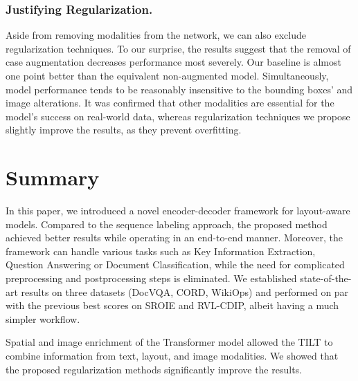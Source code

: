 \documentclass[runningheads]{llncs}
\begin{document}
\subsubsection{Justifying Regularization.} Aside from removing modalities from the network, we can also exclude regularization techniques.
To our surprise, the results suggest that the removal of case augmentation decreases performance most severely. Our baseline is almost one point better than the equivalent non-augmented model.
Simultaneously, model performance tends to be reasonably insensitive to the bounding boxes' and image alterations.
It was confirmed that other modalities are essential for the model's success on real-world data, whereas regularization techniques we propose slightly improve the results, as they prevent overfitting.













\section{Summary}
In this paper, we introduced a novel encoder-decoder framework for layout-aware models. Compared to the sequence labeling approach, the proposed method achieved better results while operating in an end-to-end manner. Moreover, the framework can handle various tasks such as Key Information Extraction, Question Answering or Document Classification, while the need for complicated preprocessing and postprocessing steps is eliminated.
We established state-of-the-art results on three datasets (DocVQA, CORD, WikiOps) and performed on par with the previous best scores on SROIE and RVL-CDIP, albeit having a much simpler workflow.

Spatial and image enrichment of the Transformer model allowed the TILT to combine information from text, layout, and image modalities. We showed that the proposed regularization methods significantly improve the results.












\end{document}
